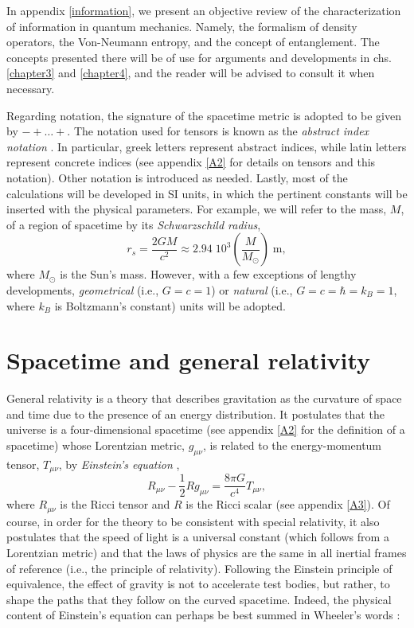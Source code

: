 \documentclass[
12pt,		%
openright,	%
twoside,  %
a4paper,			%
chapter=TITLE,		%
english,			%
french,				%
spanish,			%
brazil				%
]{USPSC-classe/USPSC}
\begin{document}
In appendix \ref{information}, we present an objective review of the characterization of information in quantum mechanics. Namely, the formalism of density operators, the Von-Neumann entropy, and the concept of entanglement. The concepts presented there will be of use for arguments and developments in chs. \ref{chapter3} and \ref{chapter4}, and the reader will be advised to consult it when necessary.

Regarding notation, the signature of the spacetime metric is adopted to be given by $-+\ldots+$. The notation used for tensors is known as the \textit{abstract index notation} \cite{Wald1984}. In particular, greek letters represent abstract indices, while latin letters represent concrete indices (see appendix \ref{A2} for details on tensors and this notation). Other notation is introduced as needed. Lastly, most of the calculations will be developed in SI units, in which the pertinent constants will be inserted with the physical parameters. For example, we will refer to the mass, $M$, of a region of spacetime by its \textit{Schwarzschild radius}, 
\begin{equation}\label{schr}
    r_s=\frac{2GM}{c^2}\approx 2.94\;10^{3} \left(\frac{M}{M_\odot}\right)\; \text{m},
\end{equation}
where $M_\odot$ is the Sun's mass. However, with a few exceptions of lengthy developments, \textit{geometrical} (i.e., $G=c=1$) or \textit{natural} (i.e., $G=c=\hbar=k_B=1$, where $k_B$ is Boltzmann's constant) units will be adopted. 


 \chapter{Spacetime and general relativity}\label{chapter1}

General relativity is a theory that describes gravitation as the curvature of space and time due to the presence of an energy distribution. It postulates that the universe is a four-dimensional spacetime (see appendix \ref{A2} for the definition of a spacetime) whose Lorentzian metric, $g_{\mu\nu}$, is related to the energy-momentum tensor, $T_{\mu\nu}$, by \textit{Einstein's equation} \cite{Wald1984,Hanoch2023},
\begin{equation}\label{eq1}
    R_{\mu\nu}-\frac{1}{2}Rg_{\mu\nu}=\frac{8\pi G}{c^4}T_{\mu\nu},
\end{equation}
where $R_{\mu\nu}$ is the Ricci tensor and $R$ is the Ricci scalar (see appendix \ref{A3}). Of course, in order for the theory to be consistent with special relativity, it also postulates that the speed of light is a universal constant (which follows from a Lorentzian metric) and that the laws of physics are the same in all inertial frames of reference (i.e., the principle of relativity). Following the Einstein principle of equivalence, the effect of gravity is not to accelerate test bodies, but rather, to shape the paths that they follow on the curved spacetime. Indeed, the physical content of Einstein's equation can perhaps be best summed in Wheeler's words \cite{Wheeler2000}:
\end{document}
